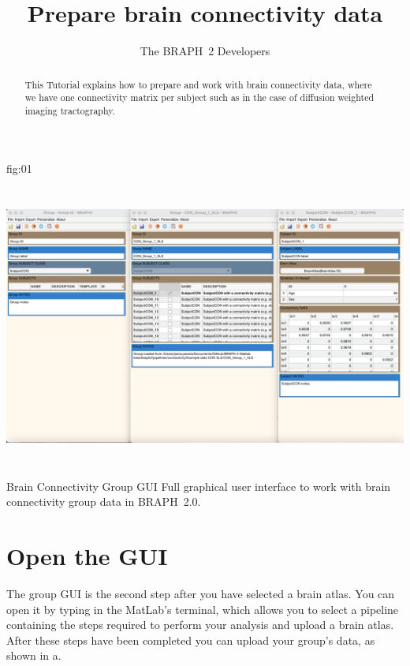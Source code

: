 \documentclass[justified]{tufte-handout}
\title{Prepare brain connectivity data}
\author[The BRAPH~2 Developers]{The BRAPH~2 Developers}
\begin{document}
\maketitle

\begin{abstract}
\noindent
This Tutorial explains how to prepare and work with brain connectivity data, where we have one connectivity matrix per subject such as in the case of diffusion weighted imaging tractography. 
\end{abstract}

\tableofcontents

	{fig:01}
	{\includegraphics[height=10cm]{tut_gr_conn/fig01.png}}
	{Brain Connectivity Group GUI}
	{
	Full graphical user interface to work with brain connectivity group data in BRAPH~2.0. 
	}

\clearpage
\section{Open the GUI}

The group GUI is the second step after you have selected a brain atlas. You can open it by typing  in the MatLab's terminal, which allows you to select a pipeline containing the steps required to perform your analysis and upload a brain atlas. After these steps have been completed you can upload your group's data, as shown in a.
\end{document}
